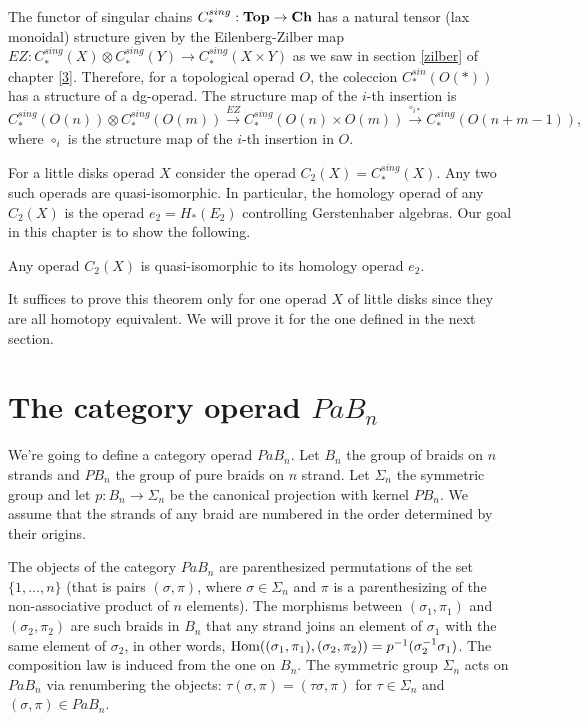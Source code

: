 \documentclass[TFM.tex]{subfiles}
\begin{document}
The functor of singular chains $C_*^{sing}:\mathrm{\mathbf{Top}}\to \mathrm{\mathbf{Ch}}$ has a natural tensor (lax monoidal) structure given by the Eilenberg-Zilber map $EZ:C_*^{sing}(X)\otimes C_*^{sing}(Y)\to C_*^{sing}(X\times Y)$ as we saw in section \ref{zilber} of chapter \ref{3}. Therefore, for a topological operad $O$, the coleccion $C_*^{sin}(O(*))$ has a structure of a dg-operad. The structure map of the $i$-th insertion is 
\[
C_*^{sing}(O(n))\otimes C_*^{sing}(O(m))\xrightarrow{EZ} C_*^{sing}(O(n)\times O(m))\xrightarrow{\circ_{i*}} C_*^{sing}(O(n+m-1)),
\]
where $\circ_i$ is the structure map of the $i$-th insertion in $O$. 

For a little disks operad $X$ consider the operad $C_2(X)=C_*^{sing}(X)$. Any two such operads are quasi-isomorphic. In particular, the homology operad of any $C_2(X)$ is the operad $e_2=H_*(E_2)$ controlling Gerstenhaber algebras. Our goal in this chapter is to show the following.

\begin{thm}
Any operad $C_2(X)$ is quasi-isomorphic to its homology operad $e_2$.
\end{thm}

It suffices to prove this theorem only for one operad $X$ of little disks since they are all homotopy equivalent. We will prove it for the one defined in the next section.

\section{The category operad $PaB_n$}\label{pab}

We're going to define a category operad $PaB_n$. Let $B_n$ the group of braids on $n$ strands and $PB_n$ the group of pure braids on $n$ strand. Let $\Sigma_n$ the symmetric group and let $p:B_n\to \Sigma_n$ be the canonical projection with kernel $PB_n$. We assume that the strands of any braid are numbered in the order determined by their origins. 

The objects of the category $PaB_n$ are parenthesized permutations of the set $\{1,\dots, n\}$ (that is pairs $(\sigma,\pi)$, where $\sigma\in\Sigma_n$ and $\pi$ is a parenthesizing of the non-associative product of $n$ elements). The morphisms between $(\sigma_1,\pi_1)$ and $(\sigma_2,\pi_2)$ are such braids in $B_n$ that any strand joins an element of $\sigma_1$ with the same element of $\sigma_2$, in other words, $\operatorname{Hom}((\sigma_1,\pi_1),(\sigma_2,\pi_2))=p^{-1}(\sigma_2^{-1}\sigma_1)$. The composition law is induced from the one on $B_n$. The symmetric group $\Sigma_n$ acts on $PaB_n$ via renumbering the objects: $\tau(\sigma,\pi)=(\tau\sigma,\pi)$ for $\tau\in\Sigma_n$ and $(\sigma,\pi)\in PaB_n$. 
\end{document}
